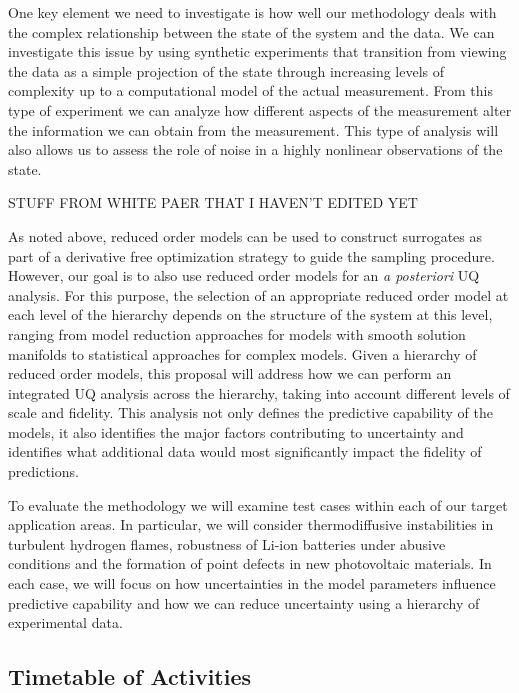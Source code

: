 \documentclass[11pt]{article}
\begin{document}
One key element we need to investigate is how well our methodology deals with the
complex relationship between the state of the system and the data.  We can investigate
this issue by using synthetic experiments that transition from viewing the data
as a simple projection of the state through increasing levels of complexity up to
a computational model of the actual measurement.  From this type of experiment we can 
analyze how different aspects of the measurement alter the information we can
obtain from the measurement.  This type of analysis will also allows us to assess the
role of noise in a highly nonlinear observations of the state.

STUFF FROM WHITE PAER THAT I HAVEN'T EDITED YET

As noted above, reduced order models can be used to construct surrogates as part of a derivative free optimization strategy
to guide the sampling procedure. However, our goal is to also use reduced order models for an {\it {a posteriori}} UQ analysis.
For this purpose, the selection of an appropriate reduced order model at each level of the hierarchy depends on the
structure of the system at this level, ranging from model reduction approaches for models with smooth solution manifolds
to statistical approaches for complex models.
Given a hierarchy of reduced order models, this proposal will address how we can perform an integrated UQ analysis 
across the hierarchy, taking into account different levels of scale and fidelity.
This analysis not only defines the predictive capability of the models, it also identifies
the major factors contributing to uncertainty and identifies what additional data would most significantly
impact the fidelity of predictions.

To evaluate the methodology we will examine test cases within each of our target application areas.  In particular,
we will consider thermodiffusive instabilities in turbulent hydrogen flames, robustness of Li-ion batteries under abusive conditions
and the formation of point defects in new photovoltaic materials.  In each case, we will focus on how uncertainties in the 
model parameters influence predictive capability and how we can reduce uncertainty using a hierarchy of experimental data.


\subsection*{Timetable of Activities}
\end{document}

